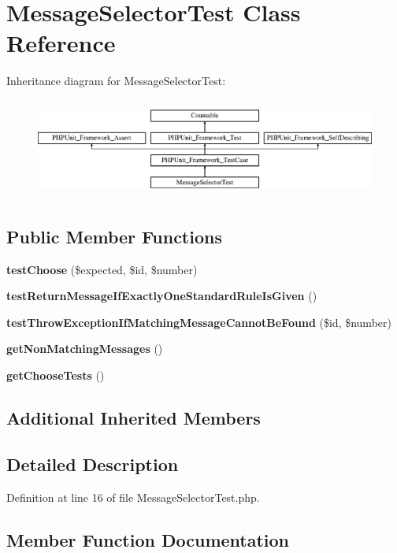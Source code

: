 \section{Message\+Selector\+Test Class Reference}
\label{class_symfony_1_1_component_1_1_translation_1_1_tests_1_1_message_selector_test}
Inheritance diagram for Message\+Selector\+Test\+:\begin{figure}[H]
\begin{center}
\leavevmode
\includegraphics[height=3.303835cm]{class_symfony_1_1_component_1_1_translation_1_1_tests_1_1_message_selector_test}
\end{center}
\end{figure}
\subsection*{Public Member Functions}
\begin{DoxyCompactItemize}
\item 
{\bf test\+Choose} (\$expected, \$id, \$number)
\item 
{\bf test\+Return\+Message\+If\+Exactly\+One\+Standard\+Rule\+Is\+Given} ()
\item 
{\bf test\+Throw\+Exception\+If\+Matching\+Message\+Cannot\+Be\+Found} (\$id, \$number)
\item 
{\bf get\+Non\+Matching\+Messages} ()
\item 
{\bf get\+Choose\+Tests} ()
\end{DoxyCompactItemize}
\subsection*{Additional Inherited Members}


\subsection{Detailed Description}


Definition at line 16 of file Message\+Selector\+Test.\+php.



\subsection{Member Function Documentation}
